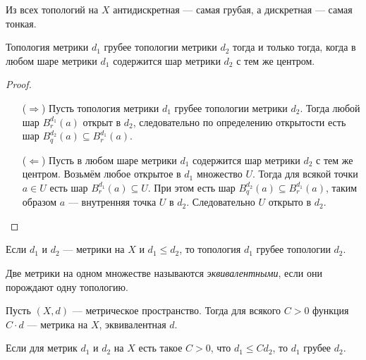 \documentclass[12pt,a4paper]{article}
\begin{document}
    \begin{example}
        Из всех топологий на $X$ антидискретная --- самая грубая, а дискретная --- самая тонкая.
    \end{example}

    \begin{theorem}\label{metric_generated_topologies_comparation_theorem}
        Топология метрики $d_1$ грубее топологии метрики $d_2$ тогда и только тогда, когда в любом шаре метрики $d_1$ содержится шар метрики $d_2$ с тем же центром.
    \end{theorem}

    \begin{proof}
        \begin{itemize}
            \item[($\Rightarrow$)] Пусть топология метрики $d_1$ грубее топологии метрики $d_2$. Тогда любой шар $B_r^{d_1}(a)$ открыт в $d_2$, следовательно по определению открытости есть шар $B_q^{d_2}(a) \subseteq B_r^{d_1}(a)$.
            \item[($\Leftarrow$)] Пусть в любом шаре метрики $d_1$ содержится шар метрики $d_2$ с тем же центром. Возьмём любое открытое в $d_1$ множество $U$. Тогда для всякой точки $a \in U$ есть шар $B_r^{d_1}(a) \subseteq U$. При этом есть шар $B_q^{d_2}(a) \subseteq B_r^{d_1}(a)$, таким образом $a$ --- внутренняя точка $U$ в $d_2$. Следовательно $U$ открыто в $d_2$.
        \end{itemize}
    \end{proof}

    \begin{corollary}
        Если $d_1$ и $d_2$ --- метрики на $X$ и $d_1 \leqslant d_2$, то топология $d_1$ грубее топологии $d_2$. 
    \end{corollary}

    \begin{definition}
        Две метрики на одном множестве называются \emph{эквивалентными}, если они порождают одну топологию.
    \end{definition}

    \begin{lemma}
        Пусть $(X, d)$ --- метрическое пространство. Тогда для всякого $C > 0$ функция $C \cdot d$ --- метрика на $X$, эквивалентная $d$. 
    \end{lemma}

    \begin{corollary}
        Если для метрик $d_1$ и $d_2$ на $X$ есть такое $C > 0$, что $d_1 \leqslant C d_2$, то $d_1$ грубее $d_2$.
    \end{corollary}
\end{document}
